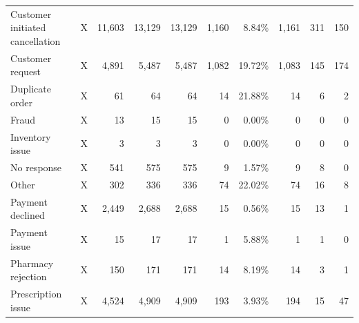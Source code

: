 \begin{landscape}
\begin{table}[!htbp]
\begin{tabular}{@{}llrrrrrrrr@{}}
{Customer initiated cancellation} & X & 11,603 & 13,129 & 13,129 & 1,160 & 8.84\% & 1,161 & 311 & 150 \\

{Customer request} & X & 4,891 & 5,487 & 5,487 & 1,082 & 19.72\% & 1,083 & 145 & 174 \\

{Duplicate order} & X & 61 & 64 & 64 & 14 & 21.88\% & 14 & 6 & 2 \\

{Fraud} & X & 13 & 15 & 15 & 0 & 0.00\% & 0 & 0 & 0 \\

{Inventory issue} & X & 3 & 3 & 3 & 0 & 0.00\% & 0 & 0 & 0 \\

{No response} & X & 541 & 575 & 575 & 9 & 1.57\% & 9 & 8 & 0 \\

{Other} & X & 302 & 336 & 336 & 74 & 22.02\% & 74 & 16 & 8 \\

{Payment declined} & X & 2,449 & 2,688 & 2,688 & 15 & 0.56\% & 15 & 13 & 1 \\

{Payment issue} & X & 15 & 17 & 17 & 1 & 5.88\% & 1 & 1 & 0 \\

{Pharmacy rejection} & X & 150 & 171 & 171 & 14 & 8.19\% & 14 & 3 & 1 \\

{Prescription issue} & X & 4,524 & 4,909 & 4,909 & 193 & 3.93\% & 194 & 15 & 47 \\


\end{tabular}
\end{table}
\end{landscape}
